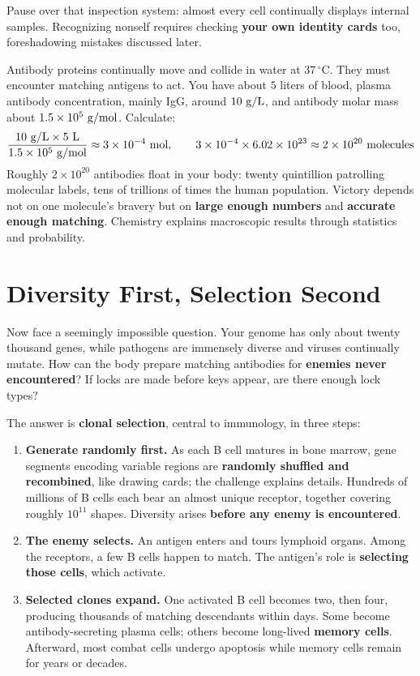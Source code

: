 Pause over that inspection system: almost every cell continually displays internal samples. Recognizing nonself requires checking \textbf{your own identity cards} too, foreshadowing mistakes discussed later.

\begin{qiaoliang}
Antibody proteins continually move and collide in water at $37\,^{\circ}\mathrm{C}$. They must encounter matching antigens to act. You have about $5$ liters of blood, plasma antibody concentration, mainly IgG, around $10\ \mathrm{g/L}$, and antibody molar mass about $1.5\times 10^{5}\ \mathrm{g/mol}$. Calculate:
\[\frac{10\ \mathrm{g/L}\times 5\ \mathrm{L}}{1.5\times 10^{5}\ \mathrm{g/mol}}\approx 3\times 10^{-4}\ \mathrm{mol},\qquad 3\times 10^{-4}\times 6.02\times 10^{23}\approx 2\times 10^{20}\ \text{molecules}\]
Roughly $2\times 10^{20}$ antibodies float in your body: twenty quintillion patrolling molecular labels, tens of trillions of times the human population. Victory depends not on one molecule's bravery but on \textbf{large enough numbers} and \textbf{accurate enough matching}. Chemistry explains macroscopic results through statistics and probability.
\end{qiaoliang}

\section{Diversity First, Selection Second}

Now face a seemingly impossible question. Your genome has only about twenty thousand genes, while pathogens are immensely diverse and viruses continually mutate. How can the body prepare matching antibodies for \textbf{enemies never encountered}? If locks are made before keys appear, are there enough lock types?

The answer is \textbf{clonal selection}, central to immunology, in three steps:

\begin{enumerate}[itemsep=2pt]
\item \textbf{Generate randomly first.} As each B cell matures in bone marrow, gene segments encoding variable regions are \textbf{randomly shuffled and recombined}, like drawing cards; the challenge explains details. Hundreds of millions of B cells each bear an almost unique receptor, together covering roughly $10^{11}$ shapes. Diversity arises \textbf{before any enemy is encountered}.
\item \textbf{The enemy selects.} An antigen enters and tours lymphoid organs. Among the receptors, a few B cells happen to match. The antigen's role is \textbf{selecting those cells}, which activate.
\item \textbf{Selected clones expand.} One activated B cell becomes two, then four, producing thousands of matching descendants within days. Some become antibody-secreting plasma cells; others become long-lived \textbf{memory cells}. Afterward, most combat cells undergo apoptosis while memory cells remain for years or decades.
\end{enumerate}


